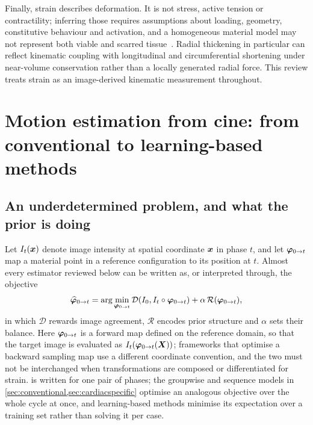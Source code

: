 Finally, strain describes deformation. It is not stress, active tension or contractility; inferring
those requires assumptions about loading, geometry, constitutive behaviour and activation, and a
homogeneous material model may not represent both viable and scarred tissue~\citep{almeida2021,amzulescu2019}.
Radial thickening in particular can reflect kinematic coupling with longitudinal and circumferential
shortening under near-volume conservation rather than a locally generated radial force. This review
treats strain as an image-derived kinematic measurement throughout.

\section{Motion estimation from cine: from conventional to learning-based methods}\label{sec:methods_families}

\subsection{An underdetermined problem, and what the prior is doing}\label{sec:illposed}

Let $I_t(\bm{x})$ denote image intensity at spatial coordinate $\bm{x}$ in phase $t$, and let
$\bm{\varphi}_{0\rightarrow t}$ map a material point in a reference configuration to its position
at $t$. Almost every estimator reviewed below can be written as, or interpreted through, the
objective
\begin{equation}
\widehat{\bm{\varphi}}_{0\rightarrow t}
=\arg\min_{\bm{\varphi}_{0\rightarrow t}}
\mathcal{D}\!\left(I_0,I_t\circ\bm{\varphi}_{0\rightarrow t}\right)
+\alpha\,\mathcal{R}(\bm{\varphi}_{0\rightarrow t}),
\label{eq:registration}
\end{equation}
in which $\mathcal{D}$ rewards image agreement, $\mathcal{R}$ encodes prior structure and $\alpha$
sets their balance. Here $\bm{\varphi}_{0\rightarrow t}$ is a forward map defined on the reference
domain, so that the target image is evaluated as $I_t(\bm{\varphi}_{0\rightarrow t}(\bm{X}))$;
frameworks that optimise a backward sampling map use a different coordinate convention, and the two
must not be interchanged when transformations are composed or differentiated for strain.
 is written for one pair of phases; the groupwise and sequence models in
\cref{sec:conventional,sec:cardiacspecific} optimise an analogous objective over the whole cycle at
once, and learning-based methods minimise its expectation over a training set rather than solving it
per case.

